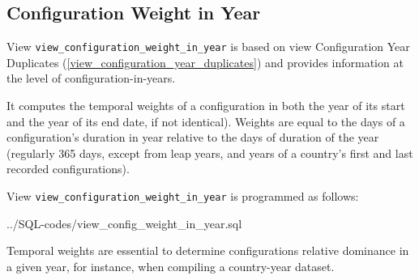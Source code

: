 \subsection{Configuration Weight in Year}\label{view_config_weight_in_year}
View \texttt{\footnotesize view\_configuration\_weight\_in\_year} is based on view Configuration Year Duplicates (\ref{view_configuration_year_duplicates}) and provides information at the level of configuration-in-years.

It computes the temporal weights of a configuration in both the year of its start and the year of its end date, if not identical).  Weights are equal to the days of a configuration's duration in year relative to the days of duration of the year (regularly 365 days, except from leap years, and years of a country's first and last recorded configurations).

View \texttt{\footnotesize view\_configuration\_weight\_in\_year} is programmed as follows: 

%
{../SQL-codes/view_config_weight_in_year.sql}

Temporal weights are essential to determine configurations relative dominance in a given year, for instance, when compiling a country-year dataset.
